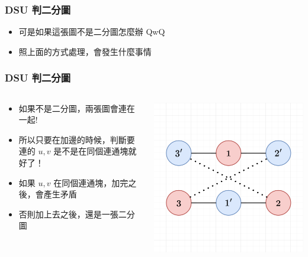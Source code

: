 \documentclass[aspectratio=169]{beamer}
\begin{document}
    \begin{frame}
        \frametitle{DSU 判二分圖}
            \begin{itemize}
                \item 可是如果這張圖不是二分圖怎麼辦 QwQ
                \item<2-> 照上面的方式處理，會發生什麼事情
            \end{itemize}
    \end{frame}
    
    \begin{frame}
        \frametitle{DSU 判二分圖}
        \begin{columns}
            \begin{column}{0.6 \textwidth}
                \begin{itemize}
                    \item 如果不是二分圖，兩張圖會連在一起!
                    \item<2-> 所以只要在加邊的時候，判斷要連的 $u,v$ 是不是在同個連通塊就好了！
                    \item<3-> 如果 $u,v$ 在同個連通塊，加完之後，會產生矛盾
                    \item<3-> 否則加上去之後，還是一張二分圖
                \end{itemize}
            \end{column}
            \begin{column}{0.4 \textwidth}
                \begin{center}
                    \includegraphics[scale=0.3]{images/not_bipartite.png}
                \end{center}
            \end{column}
        \end{columns}
    \end{frame}
\end{document}

